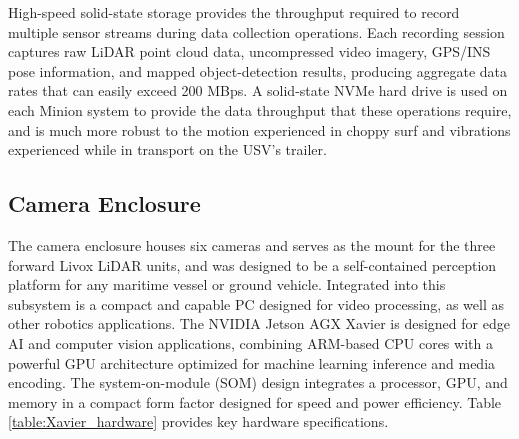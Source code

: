 \documentclass{erauthesis}
\begin{document}
High-speed solid-state storage provides the throughput required to record multiple sensor streams during data collection operations.
Each recording session captures raw \ac{LiDAR} point cloud data, uncompressed video imagery, GPS/INS pose information, and mapped object-detection results, producing aggregate data rates that can easily exceed 200 \ac{MBps}.
A solid-state NVMe hard drive is used on each Minion system to provide the data throughput that these operations require, and is much more robust to the motion experienced in choppy surf and vibrations experienced while in transport on the \ac{USV}'s trailer.


\subsection{Camera Enclosure} \label{comp:camera_enclosure}








The camera enclosure houses six cameras and serves as the mount for the three forward Livox LiDAR units, and was designed to be a self-contained perception platform for any maritime vessel or ground vehicle. 
Integrated into this subsystem is a compact and capable PC designed for video processing, as well as other robotics applications.
The NVIDIA Jetson AGX Xavier is designed for edge AI and computer vision applications, combining ARM-based CPU cores with a powerful GPU architecture optimized for machine learning inference and media encoding. 
The system-on-module (SOM) design integrates a processor, GPU, and memory in a compact form factor designed for speed and power efficiency.
Table \ref{table:Xavier_hardware} provides key hardware specifications.
\end{document}
